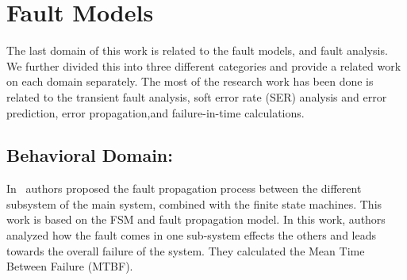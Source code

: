 


\section{Fault Models}


The last domain of this work is related to the fault models, and fault analysis. We further divided this into three different categories and provide a related work on each domain separately. The most of the research work has been done is related to the transient fault analysis, soft error rate (SER) analysis and error prediction, error propagation,and failure-in-time calculations.



\subsection{Behavioral Domain:}


In~\citep{chen2017fault} authors proposed the fault propagation process between the different subsystem of the
main system, combined with the finite state machines. This work is based on the FSM and fault propagation model. In this work, authors analyzed how the fault comes in one sub-system effects the others and leads towards the overall failure of the system. They calculated the Mean Time Between Failure (MTBF).

